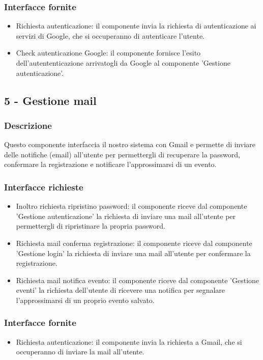 \documentclass[a4paper,12pt]{article}
\begin{document}
\subsubsection*{Interfacce fornite}
\begin{itemize} \setlength\itemsep{0.01em}
\item {\sffamily Richiesta autenticazione}: il componente invia la richiesta di autenticazione ai servizi di Google, che si occuperanno di autenticare l'utente.
\item {\sffamily Check autenticazione Google}: il componente fornisce l'esito dell'autententicazione arrivatogli da Google al componente 'Gestione autenticazione'.
\end{itemize}



\subsection*{5 -  Gestione mail}
\subsubsection*{Descrizione}
Questo componente interfaccia il nostro sistema con Gmail e permette di inviare delle notifiche (email) all'utente per permettergli di recuperare la password, confermare la registrazione e notificare l'approssimarsi di un evento. 
\subsubsection*{Interfacce richieste}
\begin{itemize} \setlength\itemsep{0.01em}
\item {\sffamily Inoltro richiesta ripristino password}: il componente riceve dal componente 'Gestione autenticazione' la richiesta di inviare una mail all'utente per permettergli di ripristinare la propria password.
\item {\sffamily Richiesta mail conferma registrazione}: il componente riceve dal componente 'Gestione login' la richiesta di inviare una mail all'utente per confermare la registrazione.
\item {\sffamily Richiesta mail notifica evento}: il componente riceve dal componente 'Gestione eventi' la richiesta dell'utente di ricevere una notifica per segnalare l'approssimarsi di un proprio evento salvato.

\end{itemize}

\subsubsection*{Interfacce fornite}
\begin{itemize} \setlength\itemsep{0.01em}
\item {\sffamily Richiesta autenticazione}: il componente invia la richiesta a Gmail, che si occuperanno di inviare la mail all'utente.
\end{itemize}
\end{document}
